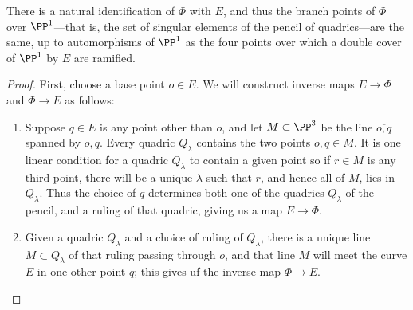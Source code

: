 \begin{proposition}\label{rulings on pencil}
There is a natural identification of $\Phi$ with $E$, and thus the branch points of $\Phi$ over $\PP^1$---that is, the set of singular elements of the pencil of quadrics---are the same, up to automorphisms of $\PP^1$ as the four points over which a double cover of $\PP^1$ by $E$ are ramified.
\end{proposition} 


\begin{proof}
First, choose a base point $o \in E$. We will construct inverse maps $E \to \Phi$ and $\Phi \to E$ as follows:
\begin{enumerate}

\item Suppose $q \in E$ is any point other than $o$, and let $M\subset \PP^3$ be the line $\overline{o,q}$ spanned by $o,q$. Every quadric $Q_\lambda$ contains the two points $o, q \in M$. It is one linear condition
for a quadric $Q_{\lambda}$ to contain a given point  so if $r\in M$ is any third point, there will be a unique $\lambda$ such that $r$, and hence all of $M$, lies in $Q_\lambda$. Thus the choice of $q$ determines both one of the quadrics $Q_\lambda$ of the pencil, and a ruling of that quadric, giving us a map $E \to \Phi$.

\item  Given a quadric $Q_\lambda$ and a choice of ruling of $Q_\lambda$, there is a unique line $M \subset Q_\lambda$ of that ruling passing through $o$, and that line $M$ will meet the curve $E$ in one other point $q$; this gives uf the inverse map $\Phi \to E$.
\end{enumerate}
\end{proof}

